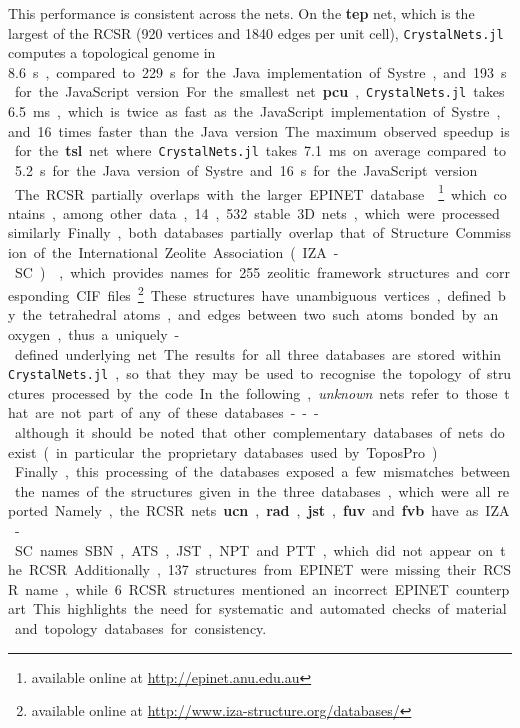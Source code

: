 \documentclass[main.tex]{subfiles}
\begin{document}
This performance is consistent across the nets. On the \textbf{tep} net, which is the largest of the RCSR (920 vertices and 1840 edges per unit cell), \texttt{CrystalNets.jl} computes a topological genome in \SI{8.6}s, compared to \SI{229}s for the Java implementation of Systre, and \SI{193}s for the JavaScript version. For the smallest net \textbf{pcu}, \texttt{CrystalNets.jl} takes \SI{6.5}{ms}, which is twice as fast as the JavaScript implementation of Systre, and 16 times faster than the Java version. The maximum observed speedup is for the \textbf{tsl} net where \texttt{CrystalNets.jl} takes \SI{7.1}{ms} on average compared to \SI{5.2}s for the Java version of Systre and \SI{16}s for the JavaScript version.\\

The RCSR partially overlaps with the larger EPINET database \autocite{Epinet0} \footnote{available online at \url{http://epinet.anu.edu.au}} which contains, among other data, 14,532 stable 3D nets, which were processed similarly. Finally, both databases partially overlap that of Structure Commission of the International Zeolite Association (IZA-SC) \autocite{IZA}, which provides names for 255 zeolitic framework structures and corresponding CIF files.\footnote{available online at \url{http://www.iza-structure.org/databases/}} These structures have unambiguous vertices, defined by the tetrahedral atoms, and edges between two such atoms bonded by an oxygen, thus a uniquely-defined underlying net.

The results for all three databases are stored within \texttt{CrystalNets.jl}, so that they may be used to recognise the topology of structures processed by the code. In the following, \emph{unknown} nets refer to those that are not part of any of these databases --- although it should be noted that other complementary databases of nets do exist (in particular the proprietary databases used by ToposPro).\\

Finally, this processing of the databases exposed a few mismatches between the names of the structures given in the three databases, which were all reported. Namely, the RCSR nets \textbf{ucn}, \textbf{rad}, \textbf{jst}, \textbf{fuv} and \textbf{fvb} have as IZA-SC names SBN, ATS, JST, NPT and PTT, which did not appear on the RCSR. Additionally, 137 structures from EPINET were missing their RCSR name, while 6 RCSR structures mentioned an incorrect EPINET counterpart.
This highlights the need for systematic and automated checks of material and topology databases for consistency.
\end{document}
